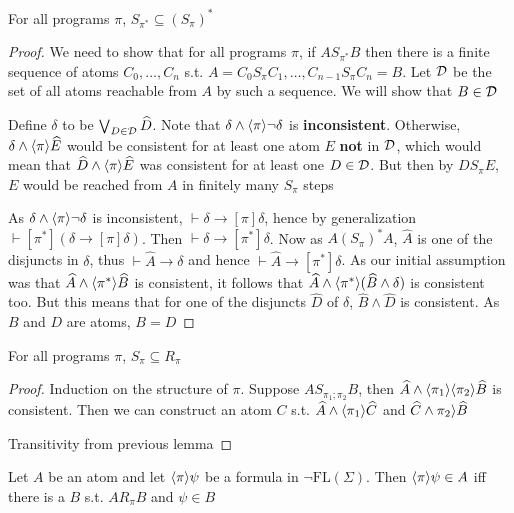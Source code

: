 \documentclass[11pt]{article}
\newcommand{\FL}{\text{FL}}
\begin{document}
\begin{lemma}[]
For all programs \(\pi\), \(S_{\pi^*}\subseteq(S_\pi)^*\)
\end{lemma}

\begin{proof}
We need to show that for all programs \(\pi\), if \(AS_{\pi^*}B\)  then there is a
finite sequence of atoms \(C_0,\dots,C_n\) s.t. \(A=C_0S_\pi
   C_1,\dots,C_{n-1}S_\pi C_n=B\). Let \(\mathcal{D}\) be the set of all atoms
reachable from \(A\) by such a sequence. We will show that \(B\in\mathcal{D}\)

Define \(\delta\) to be \(\bigvee_{D\in\mathcal{D}}\widehat{D}\). Note that
\(\delta\wedge\langle\pi\rangle\neg\delta\) is \textbf{inconsistent}. Otherwise,
\(\delta\wedge\langle\pi\rangle\widehat{E}\) would be consistent for at least one atom \(E\)
\textbf{not} in \(\mathcal{D}\), which would mean that
\(\widehat{D}\wedge\langle\pi\rangle\widehat{E}\) was consistent for at least one
\(D\in\mathcal{D}\). But then by \(DS_\pi E\), \(E\) would be reached from \(A\) in
finitely many \(S_\pi\) steps

As \(\delta\wedge\langle\pi\rangle\neg\delta\) is inconsistent,
\(\vdash\delta\to[\pi]\delta\), hence by generalization
\(\vdash[\pi^*](\delta\to[\pi]\delta)\). Then \(\vdash\delta\to[\pi^*]\delta\). Now as
\(A(S_\pi)^*A\), \(\widehat{A}\) is one of the disjuncts in \(\delta\), thus
\(\vdash\widehat{A}\to\delta\) and hence \(\vdash\widehat{A}\to[\pi^*]\delta\).
As our initial assumption was that
\(\widehat{A}\wedge\langle\pi^*\rangle\widehat{B}\) is consistent, it follows that
\(\widehat{A}\wedge\langle\pi^*\rangle(\widehat{B}\wedge\delta)\) is consistent too.
But this means that for one of the disjuncts \(\widehat{D}\) of \(\delta\),
\(\widehat{B}\wedge\widehat{D}\) is consistent. As \(B\) and \(D\) are atoms, \(B=D\)
\end{proof}

\begin{lemma}[]
For all programs \(\pi\), \(S_\pi\subseteq R_\pi\)
\end{lemma}

\begin{proof}
Induction on the structure of \(\pi\). Suppose \(AS_{\pi_1;\pi_2}B\), then
\(\widehat{A}\wedge\langle\pi_1\rangle\langle\pi_2\rangle\widehat{B}\) is consistent. Then
we can construct an atom \(C\) s.t.
\(\widehat{A}\wedge\langle\pi_1\rangle\widehat{C}\) and
\(\widehat{C}\wedge\pi_2\rangle\widehat{B}\)

Transitivity from previous lemma
\end{proof}

\begin{lemma}
Let \(A\) be an atom and let \(\langle\pi\rangle\psi\) be a formula in
\(\neg\FL(\Sigma)\). Then \(\langle\pi\rangle\psi\in A\) iff there is a \(B\) s.t.
\(AR_\pi B\) and \(\psi\in B\)
\end{lemma}
\end{document}

